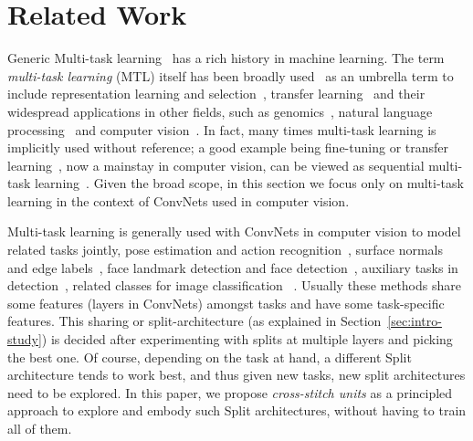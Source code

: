 \documentclass[10pt,twocolumn,letterpaper]{article}
\begin{document}
\section{Related Work}
Generic Multi-task learning~\cite{stein1956inadmissibility,caruanaThesis} has a rich history in machine learning. The term \emph{multi-task learning} (MTL) itself has been broadly used~\cite{jalali2010dirty,romera2012exploiting,amit2007uncovering,yang2014unified,xue2007multi,evgeniou2004regularized} as an umbrella term to include representation learning and selection~\cite{evgeniou2007multi,argyriou2008convex,whomToShare,obozinski2006multi}, transfer learning~\cite{pan2010survey,yosinski2014transferable, razavian2014cnn} \etc and their widespread applications in other fields, such as genomics~\cite{obozinski2010joint}, natural language processing~\cite{collobert2011natural,collobert2008unified,liu2015representation} and computer vision~\cite{whomToShare,zhang2013robust, wright2010sparse,donahue2013decaf,jung2015rotating,torralba2007sharing,quattoni2008transfer,pentina2015curriculum}. In fact, many times multi-task learning is implicitly used without reference; a good example being fine-tuning or transfer learning~\cite{razavian2014cnn}, now a mainstay in computer vision, can be viewed as sequential multi-task learning~\cite{caruanaThesis}. Given the broad scope, in this section we focus only on multi-task learning in the context of ConvNets used in computer vision.

Multi-task learning is generally used with ConvNets in computer vision to model related tasks jointly, \eg pose estimation and action recognition~\cite{gkioxari2014r}, surface normals and edge labels~\cite{wangfouhey}, face landmark detection and face detection~\cite{zhang2014facial, zhang2014improving}, auxiliary tasks in detection~\cite{fast-rcnn}, related classes for image classification~\cite{teterwakshared} \etc. Usually these methods share some features (layers in ConvNets) amongst tasks and have some task-specific features. This sharing or split-architecture (as explained in Section~\ref{sec:intro-study}) is decided after experimenting with splits at multiple layers and picking the best one. Of course, depending on the task at hand, a different Split architecture tends to work best, and thus given new tasks, new split architectures need to be explored. In this paper, we propose \emph{cross-stitch units} as a principled approach to explore and embody such Split architectures, without having to train all of them.
\end{document}
